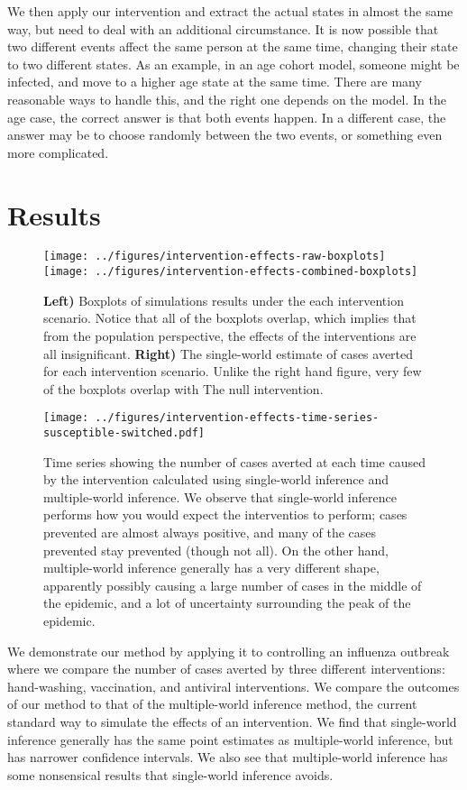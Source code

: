 \documentclass[openacc]{rsproca_new}%
\begin{document}
We then apply our intervention and extract the actual states in almost the same way, but need to deal with an additional circumstance.
It is now possible that two different events affect the same person at the same time, changing their state to two different states.
As an example, in an age cohort model, someone might be infected, and move to a higher age state at the same time.
There are many reasonable ways to handle this, and the right one depends on the model.
In the age case, the correct answer is that both events happen.
In a different case, the answer may be to choose randomly between the two events, or something even more complicated.

\section{Results}

\begin{figure}\label{fig:epicurve}
\centering
\texttt{[image: ../figures/intervention-effects-raw-boxplots]}
\texttt{[image: ../figures/intervention-effects-combined-boxplots]}
\caption{\textbf{Left)} Boxplots of simulations results under the each intervention scenario.  Notice that all of the boxplots overlap, which implies that from the population perspective, the effects of the interventions are all insignificant.  \textbf{Right)} The single-world estimate of cases averted for each intervention scenario.  Unlike the right hand figure, very few of the boxplots overlap with The null intervention.}
\end{figure}
\begin{figure}\label{fig:epicurve}
\centering
\texttt{[image: ../figures/intervention-effects-time-series-susceptible-switched.pdf]}
\caption{Time series showing the number of cases averted at each time caused by the intervention calculated using single-world inference and multiple-world inference.  We observe that single-world inference performs how you would expect the interventios to perform; cases prevented are almost always positive, and many of the cases prevented stay prevented (though not all). On the other hand, multiple-world inference generally has a very different shape, apparently possibly causing a large number of cases in the middle of the epidemic, and a lot of uncertainty surrounding the peak of the epidemic.}
\end{figure}

We demonstrate our method by applying it to controlling an influenza outbreak where we compare the number of cases averted by three different interventions: hand-washing, vaccination, and antiviral interventions.
We compare the outcomes of our method to that of the multiple-world inference method, the current standard way to simulate the effects of an intervention.
We find that single-world inference generally has the same point estimates as multiple-world inference, but has narrower confidence intervals.
We also see that multiple-world inference has some nonsensical results that single-world inference avoids.
\end{document}
